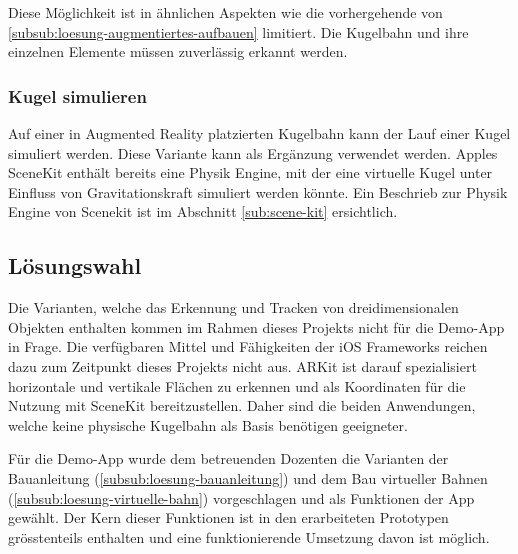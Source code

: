 Diese Möglichkeit ist in ähnlichen Aspekten wie die vorhergehende von \ref{subsub:loesung-augmentiertes-aufbauen} limitiert.
Die Kugelbahn und ihre einzelnen Elemente müssen zuverlässig erkannt werden.

\subsubsection{Kugel simulieren}

Auf einer in Augmented Reality platzierten Kugelbahn kann der Lauf einer Kugel simuliert werden.
Diese Variante kann als Ergänzung verwendet werden.
Apples SceneKit enthält bereits eine Physik Engine, mit der eine virtuelle Kugel unter Einfluss von Gravitationskraft simuliert werden könnte. Ein Beschrieb zur Physik Engine von Scenekit ist im Abschnitt \ref{sub:scene-kit} ersichtlich.

\subsection{Lösungswahl}\label{sub:loesungswahl}

Die Varianten, welche das Erkennung und Tracken von dreidimensionalen Objekten enthalten kommen im Rahmen dieses Projekts nicht für die Demo-App in Frage.
Die verfügbaren Mittel und Fähigkeiten der iOS Frameworks reichen dazu zum Zeitpunkt dieses Projekts nicht aus.
ARKit ist darauf spezialisiert horizontale und vertikale Flächen zu erkennen und als Koordinaten für die Nutzung mit SceneKit bereitzustellen.
Daher sind die beiden Anwendungen, welche keine physische Kugelbahn als Basis benötigen geeigneter.

Für die Demo-App wurde dem betreuenden Dozenten die Varianten der Bauanleitung (\ref{subsub:loesung-bauanleitung}) und dem Bau virtueller Bahnen (\ref{subsub:loesung-virtuelle-bahn}) vorgeschlagen und als Funktionen der App gewählt.
Der Kern dieser Funktionen ist in den erarbeiteten Prototypen grösstenteils enthalten und eine funktionierende Umsetzung davon ist möglich.
